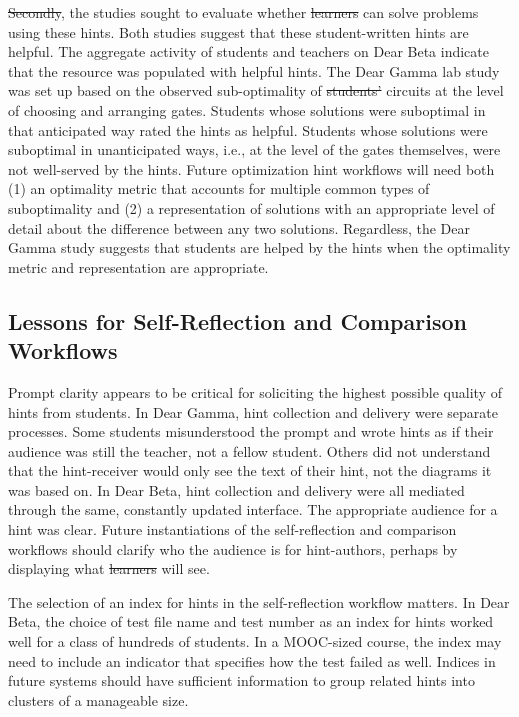 \documentclass[12pt,twoside]{mitthesis}
\providecommand{\DIFaddtex}[1]{{\protect\color{blue}\uwave{#1}}} %
\providecommand{\DIFdeltex}[1]{{\protect\color{red}\sout{#1}}}                      %
\providecommand{\DIFaddbegin}{} %
\providecommand{\DIFaddend}{} %
\providecommand{\DIFdelbegin}{} %
\providecommand{\DIFdelend}{} %
\providecommand{\DIFadd}[1]{\texorpdfstring{\DIFaddtex{#1}}{#1}} %
\providecommand{\DIFdel}[1]{\texorpdfstring{\DIFdeltex{#1}}{}} %
\begin{document}
{{{{{{{{{{\DIFdelbegin \DIFdel{Secondly}\DIFdelend \DIFaddbegin \DIFadd{Second}\DIFaddend , the studies sought to evaluate whether \DIFdelbegin \DIFdel{learners }\DIFdelend \DIFaddbegin \DIFadd{students }\DIFaddend can solve problems using these hints. Both studies suggest that these student-written hints are helpful. The aggregate activity of students and teachers on Dear Beta indicate that the resource was populated with helpful hints. The Dear Gamma lab study was set up based on the observed sub-optimality of \DIFdelbegin \DIFdel{students' }\DIFdelend \DIFaddbegin \DIFadd{student }\DIFaddend circuits at the level of choosing and arranging gates. Students whose solutions were suboptimal in that anticipated way rated the hints as helpful. Students whose solutions were suboptimal in unanticipated ways, i.e., at the level of the gates themselves, were not well-served by the hints. Future optimization hint workflows will need both (1) an optimality metric that accounts for multiple common types of suboptimality and (2) a representation of solutions with an appropriate level of detail about the difference between any two solutions. Regardless, the Dear Gamma study suggests that students are helped by the hints when the optimality metric and representation are appropriate.

\subsection{Lessons for Self-Reflection and Comparison Workflows}

Prompt clarity appears to be critical for soliciting the highest possible quality of hints from students. In Dear Gamma, hint collection and delivery were separate processes. Some students misunderstood the prompt and wrote hints as if their audience was still the teacher, not a fellow student. Others did not understand that the hint-receiver would only see the text of their hint, not the diagrams it was based on. In Dear Beta, hint collection and delivery were all mediated through the same, constantly updated interface. The appropriate audience for a hint was clear. Future instantiations of the self-reflection and comparison workflows should clarify who the audience is for hint-authors, perhaps by displaying what \DIFdelbegin \DIFdel{learners }\DIFdelend \DIFaddbegin \DIFadd{students }\DIFaddend will see. 

The selection of an index for hints in the self-reflection workflow matters. In Dear Beta, the choice of test file name and test number as an index for hints worked well for a class of hundreds of students. In a MOOC-sized course, the index may need to include an indicator that specifies how the test failed as well. Indices in future systems should have sufficient information to group related hints into clusters of a manageable size.

}}}}}}}}}}
\end{document}
